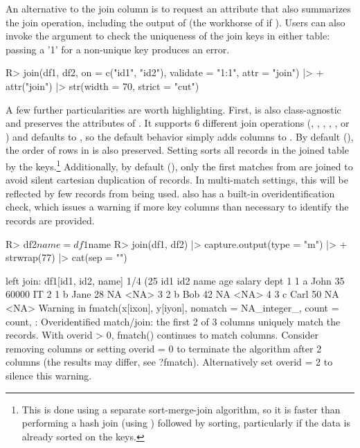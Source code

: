 \documentclass[article]{jss}
\newcommand{\fct}[1]{\code{#1()}}
\begin{document}
%
An alternative to the join column is to request an attribute that also summarizes the join operation, including the output of \fct{fmatch} (the workhorse of \fct{join} if ). Users can also invoke the  argument to check the uniqueness of the join keys in either table: passing a '1' for a non-unique key produces an error.
%
\begin{Schunk}
\begin{Sinput}
R> join(df1, df2, on = c("id1", "id2"), validate = "1:1", attr = "join") |>
+    attr("join") |> str(width = 70, strict = "cut")
\end{Sinput}
\end{Schunk}
%
A few further particularities are worth highlighting. First,  is also class-agnostic and preserves the attributes of . It supports 6 different join operations (, , , , , or ) and defaults to , so the default behavior simply adds columns to . By default (), the order of rows in  is also preserved. Setting  sorts all records in the joined table by the keys.\footnote{This is done using a separate sort-merge-join algorithm, so it is faster than performing a hash join (using \fct{fmatch}) followed by sorting, particularly if the data is already sorted on the keys. } Additionally, by default (), only the first matches from  are joined to avoid silent cartesian duplication of records. In multi-match settings, this will be reflected by few records from  being used. \fct{fmatch} also has a built-in overidentification check, which issues a warning if more key columns than necessary to identify the records are provided.
%
\begin{Schunk}
\begin{Sinput}
R> df2$name = df1$name
R> join(df1, df2) |> capture.output(type = "m") |>
+    strwrap(77) |> cat(sep = "\n")
\end{Sinput}
\begin{Soutput}
left join: df1[id1, id2, name] 1/4 (25%) <m:m> df2[id1, id2, name] 1/4 (25%)
  id1 id2 name age salary dept
1   1   a John  35  60000   IT
2   1   b Jane  28     NA <NA>
3   2   b  Bob  42     NA <NA>
4   3   c Carl  50     NA <NA>
Warning in fmatch(x[ixon], y[iyon], nomatch = NA_integer_, count = count, :
Overidentified match/join: the first 2 of 3 columns uniquely match the
records. With overid > 0, fmatch() continues to match columns. Consider
removing columns or setting overid = 0 to terminate the algorithm after 2
columns (the results may differ, see ?fmatch). Alternatively set overid = 2
to silence this warning.
\end{Soutput}
\end{Schunk}
\end{document}
